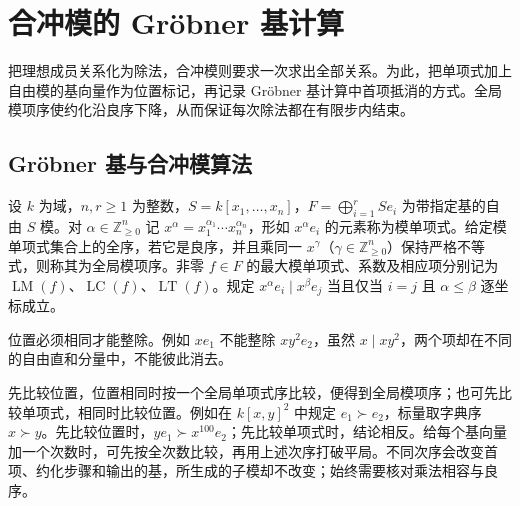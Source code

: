 
\section{合冲模的 Gröbner 基计算}
\label{b3:sec:2104}


%
%
%

把理想成员关系化为除法，合冲模则要求一次求出全部关系。为此，把单项式加上自由模的基向量作为位置标记，再记录 Gröbner 基计算中首项抵消的方式。全局模项序使约化沿良序下降，从而保证每次除法都在有限步内结束。

\subsection{Gröbner 基与合冲模算法}
\label{b3:subsec:2104:01}

\begin{definition}\label{b3:def:global-module-order}
	设 \(k\) 为域，\(n,r\ge1\) 为整数，\(S=k[x_1,\ldots,x_n]\)，\(F=\bigoplus_{i=1}^rSe_i\) 为带指定基的自由 \(S\) 模。对 \(\alpha\in\mathbb Z_{\ge0}^n\) 记 \(x^\alpha=x_1^{\alpha_1}\cdots x_n^{\alpha_n}\)，形如 \(x^\alpha e_i\) 的元素称为模单项式。给定模单项式集合上的全序，若它是良序，并且乘同一 \(x^\gamma\)（\(\gamma\in\mathbb Z_{\ge0}^n\)）保持严格不等式，则称其为全局模项序。非零 \(f\in F\) 的最大模单项式、系数及相应项分别记为 \(\operatorname{LM}(f)\)、\(\operatorname{LC}(f)\)、\(\operatorname{LT}(f)\)。规定 \(x^\alpha e_i\mid x^\beta e_j\) 当且仅当 \(i=j\) 且 \(\alpha\le\beta\) 逐坐标成立。
\end{definition}

位置必须相同才能整除。例如 \(xe_1\) 不能整除 \(xy^2e_2\)，虽然 \(x\mid xy^2\)，两个项却在不同的自由直和分量中，不能彼此消去。

\ProseParagraphBreak
先比较位置，位置相同时按一个全局单项式序比较，便得到全局模项序；也可先比较单项式，相同时比较位置。例如在 \(k[x,y]^2\) 中规定 \(e_1\succ e_2\)，标量取字典序 \(x\succ y\)。先比较位置时，\(ye_1\succ x^{100}e_2\)；先比较单项式时，结论相反。给每个基向量加一个次数时，可先按全次数比较，再用上述次序打破平局。不同次序会改变首项、约化步骤和输出的基，所生成的子模却不改变；始终需要核对乘法相容与良序。

